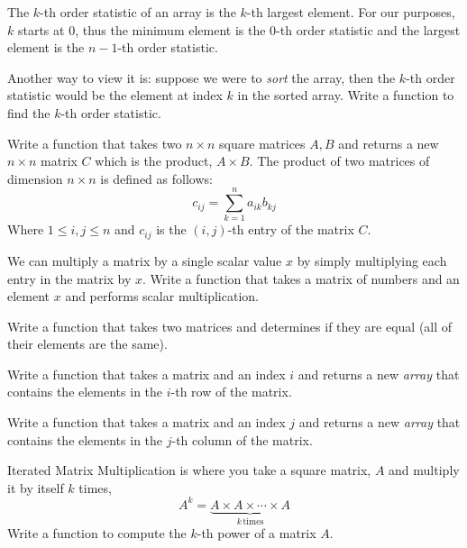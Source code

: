 \begin{exer}
The $k$-th order statistic of an array is the $k$-th largest 
element.  For our purposes, $k$ starts at 0, thus the minimum 
element is the $0$-th order statistic and the largest element is 
the $n-1$-th order statistic.

Another way to view it is: suppose we were to \emph{sort} the 
array, then the $k$-th order statistic would be the element at index 
$k$ in the sorted array.  Write a function to find the $k$-th order statistic.
\end{exer}



\begin{exer}
Write a function that takes two $n \times n$ square matrices 
$A, B$ and returns a new $n \times n$ matrix $C$ which is 
the product, $A \times B$.  The product of two matrices of 
dimension $n \times n$ is defined as follows:
$$c_{ij} = \sum_{k=1}^n a_{ik} b_{kj}$$
Where $1 \leq i,j \leq n$ and $c_{ij}$ is the $(i,j)$-th entry of the
matrix $C$.  
\end{exer}

\begin{exer}
We can multiply a matrix by a single scalar value $x$ by simply
multiplying each entry in the matrix by $x$.  Write a function that
takes a matrix of numbers and an element $x$ and performs
scalar multiplication.
\end{exer}

\begin{exer}
Write a function that takes two matrices and determines if 
they are equal (all of their elements are the same).
\end{exer}

\begin{exer}
Write a function that takes a matrix and an index $i$ and 
returns a new \emph{array} that contains the elements in the
$i$-th row of the matrix.
\end{exer}

\begin{exer}
Write a function that takes a matrix and an index $j$ and 
returns a new \emph{array} that contains the elements in the
$j$-th column of the matrix.
\end{exer}

\begin{exer}
Iterated Matrix Multiplication is where you take a square 
matrix, $A$ and multiply it by itself $k$ times, 
  $$A^k = \underbrace{A \times A \times \cdots \times A}_{k \, \mathrm{ times}}$$
Write a function to compute the $k$-th power of a matrix $A$.  
\end{exer}

